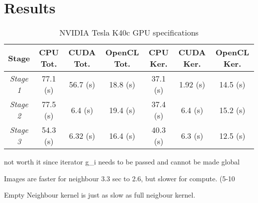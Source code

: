 \documentclass[final]{report}
\begin{document}
\chapter{Results}

\begin{table}[H]
	\centering
	\caption{NVIDIA Tesla K40c GPU specifications}
	\label{tab:gpu-specs}
	\begin{tabular}{ccccccc}
		\toprule
			\textbf{Stage}		& \textbf{CPU Tot.}	& \textbf{CUDA Tot.}	& \textbf{OpenCL Tot.}	& \textbf{CPU Ker.}	& \textbf{CUDA Ker.}	& \textbf{OpenCL Ker.}\\
		\midrule
			\textit{Stage 1}	& 77.1 (s)			& 56.7 (s) 				& 18.8 (s) 				& 37.1 (s) 			& 1.92 (s) 				& 14.5 (s)	\\
			\textit{Stage 2}	& 77.5 (s)			& 6.4 (s) 				& 19.4 (s) 				& 37.4 (s) 			& 6.4 (s) 				& 15.2 (s)	\\
			\textit{Stage 3}	& 54.3 (s)			& 6.32 (s) 				& 16.4 (s) 				& 40.3 (s) 			& 6.3 (s) 				& 12.5 (s)	\\
		\bottomrule
	\end{tabular}
\end{table}

not worth it since iterator g\_i needs to be passed and cannot be made global

Images are faster for neighbour 3.3 sec to 2.6, but slower for compute. (5-10%

 Empty Neighbour kernel is just as slow as full neigbour kernel.
\end{document}
